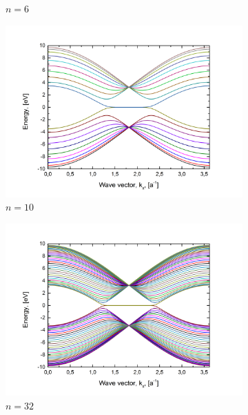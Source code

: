 \begin{figure}[hb!]
\begin{subfigure}{.5\textwidth}
  \caption{$n=6$}
  \label{fig:zz6}
\end{subfigure}
\begin{subfigure}{.5\textwidth}
  \centering
  \includegraphics[width=\linewidth]{img/zz_ribbon_10}
  \caption{$n=10$}
  \label{fig:zz10}
\end{subfigure}%
\begin{subfigure}{.5\textwidth}
  \centering
  \includegraphics[width=\linewidth]{img/zz_ribbon_32}
  \caption{$n=32$}
  \label{fig:zz32}
\end{subfigure}
\begin{subfigure}{.5\textwidth}
  \centering

\end{subfigure}
\end{figure}
